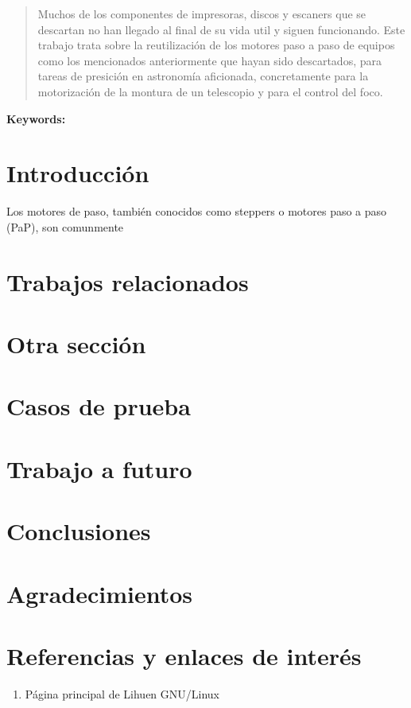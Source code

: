 \documentclass[final,narroweqnarray,inline,twoside]{ieee}
\author{Joaquín Bogado
\\LINTI. Facultad de Informática, Universidad Nacional de La Plata.
\\La Plata, B1900ASD, ARGENTINA
}
\title{}
\begin{document}
\maketitle
\sloppy

\begin{abstract}
Muchos de los componentes de impresoras, discos y escaners que se descartan no han llegado al final de su vida util y siguen
funcionando.
Este trabajo trata sobre la reutilización de los motores paso a paso de equipos como los mencionados anteriormente que hayan
sido descartados, para tareas de presición en astronomía aficionada, concretamente para la motorización de la montura de un
telescopio y para el control del foco.
\end{abstract}

\noindent \textbf{Keywords: } 

\section{Introducción}
Los motores de paso, también conocidos como steppers o motores paso a paso (PaP), son comunmente 
\section{Trabajos relacionados}

\section{Otra sección}

\section{Casos de prueba}

\section{Trabajo a futuro}

\section{Conclusiones}

\section{Agradecimientos}

\section{Referencias y enlaces de interés}

\begin{enumerate}
\item Página principal de Lihuen GNU/Linux\\
\\[Visitado el día 9 de enero de 2009]
\end{enumerate}
\end{document}

